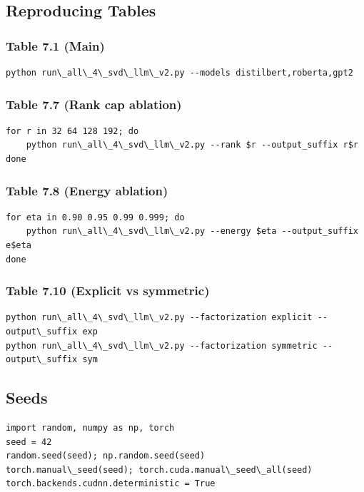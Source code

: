 \subsection{Reproducing Tables}

\subsubsection{Table 7.1 (Main)}
\begin{lstlisting}
python run\_all\_4\_svd\_llm\_v2.py --models distilbert,roberta,gpt2
\end{lstlisting}

\subsubsection{Table 7.7 (Rank cap ablation)}
\begin{lstlisting}
for r in 32 64 128 192; do
    python run\_all\_4\_svd\_llm\_v2.py --rank $r --output_suffix r$r
done
\end{lstlisting}

\subsubsection{Table 7.8 (Energy ablation)}
\begin{lstlisting}
for eta in 0.90 0.95 0.99 0.999; do
    python run\_all\_4\_svd\_llm\_v2.py --energy $eta --output_suffix e$eta
done
\end{lstlisting}

\subsubsection{Table 7.10 (Explicit vs symmetric)}
\begin{lstlisting}
python run\_all\_4\_svd\_llm\_v2.py --factorization explicit --output\_suffix exp
python run\_all\_4\_svd\_llm\_v2.py --factorization symmetric --output\_suffix sym
\end{lstlisting}

\subsection{Seeds}

\begin{lstlisting}
import random, numpy as np, torch
seed = 42
random.seed(seed); np.random.seed(seed)
torch.manual\_seed(seed); torch.cuda.manual\_seed\_all(seed)
torch.backends.cudnn.deterministic = True
\end{lstlisting}

